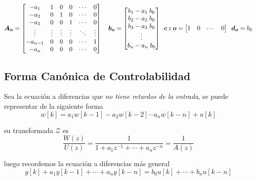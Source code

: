\begin{equation*}
    \bm{A_o} = 
    \begin{bmatrix}
    -a_1 & 1 & 0 & 0 & \cdots & 0\\
    -a_2 & 0 & 1 & 0 & \cdots & 0\\
    -a_3 & 0 & 0 & 1 & \cdots & 0\\
    \vdots & \vdots & \vdots & \vdots & \ddots & \vdots \\
    -a_{n-1} & 0 & 0 & 0 & \cdots & 1\\
    -a_{n} & 0 & 0 & 0 & \cdots & 0 \\
    \end{bmatrix}
    \hspace*{10pt}
    \bm{b_o} = 
    \begin{bmatrix}
    b_1 - a_1\; b_0 \\
    b_2 - a_2\; b_0 \\
    b_3 - a_3\; b_0 \\
    \vdots \\
    b_n - a_n\; b_0 \\
    \end{bmatrix}
    \hspace*{5pt}
    \bm{c:o} = 
    \begin{bmatrix}
    1 & 0 & \cdots & 0
    \end{bmatrix}
    \hspace*{5pt}
    \bm{d_o} = b_0
\end{equation*}

\subsection{Forma Canónica de Controlabilidad}
Sea la ecuación a diferencias que \textit{no tiene retardos de la entrada}, se puede
representar de la siguiente forma
\begin{equation}
    w[k]  = a_1 w[k-1] - a_2 w[k-2] \cdots a_n w[k-n] + u[k]
\end{equation}

su transformada $\mathcal{Z}$ es
\begin{equation*}
    \dfrac{W(z)}{U(z)} = \dfrac{1}{1 + a_1 z^{-1} + \cdots + a_n z^{-n}} = \dfrac{1}{A(z)}
\end{equation*}

luego recordemos la ecuación a diferencias más general
\begin{equation*}
    y[k] + a_1 y[k-1] + \cdots + a_n y[k-n] = b_0 u[k] + \cdots + b_n u[k-n]
\end{equation*}

